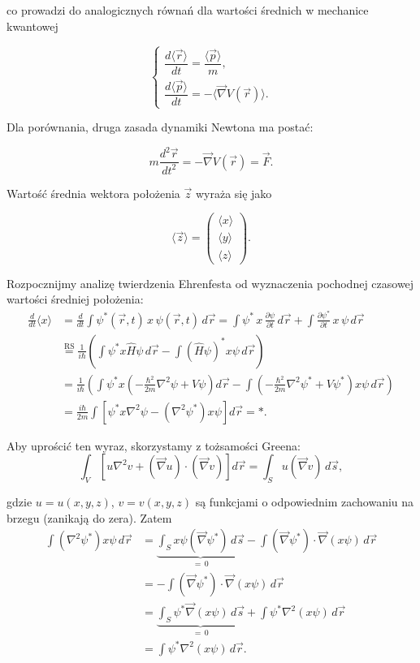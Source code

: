 co prowadzi do analogicznych równań dla wartości średnich w mechanice kwantowej

$$
\begin{cases}
    \dfrac{d \langle \vec{r} \rangle}{dt} = \dfrac{\langle \vec{p} \rangle}{m}, \\
    \dfrac{d \langle \vec{p} \rangle}{dt} = -\langle \vec{\nabla} V(\vec{r}) \rangle.
\end{cases}
$$

Dla porównania, druga zasada dynamiki Newtona ma postać:

$$
m \dfrac{d^2 \vec{r}}{dt^2} = -\vec{\nabla} V(\vec{r}) = \vec{F}.
$$

Wartość średnia wektora położenia $\vec{z}$ wyraża się jako

$$
\langle \vec{z} \rangle = 
\begin{pmatrix}
\langle x \rangle \\
\langle y \rangle \\
\langle z \rangle
\end{pmatrix}.
$$

Rozpocznijmy analizę twierdzenia Ehrenfesta od wyznaczenia pochodnej czasowej wartości średniej położenia:
\begin{align*}
\frac{d}{dt} \langle x \rangle &= \frac{d}{dt} \int \psi^*(\vec{r},t) \, x \, \psi(\vec{r},t) \, d\vec{r} = \int \psi^* \, x \, \frac{\partial \psi}{\partial t} \, d\vec{r} + \int \frac{\partial \psi^*}{\partial t} \, x \, \psi \, d\vec{r} \\
&\overset{\text{RS}}{=}\frac{1}{i\hbar} \left( \int \psi^* x \hat{H} \psi \, d\vec{r} - \int (\hat{H} \psi)^* x \psi \, d\vec{r} \right) \\
&= \frac{1}{i\hbar} \left( \int \psi^* x \left( -\frac{\hbar^2}{2m} \nabla^2 \psi + V \psi \right) d\vec{r} - \int \left( -\frac{\hbar^2}{2m} \nabla^2 \psi^* + V \psi^* \right) x \psi \, d\vec{r} \right) \\
&= \frac{i\hbar}{2m} \int \left[ \psi^* x \nabla^2 \psi - (\nabla^2 \psi^*) x \psi \right] d\vec{r} = *.
\end{align*}

Aby uprościć ten wyraz, skorzystamy z tożsamości Greena:
$$
\int_V \left[ u \nabla^2 v + (\vec{\nabla} u) \cdot (\vec{\nabla} v) \right] d\vec{r} = \int_S u (\vec{\nabla} v) \, d\vec{s},
$$

gdzie $u = u(x,y,z)$, $v = v(x,y,z)$ są funkcjami o odpowiednim zachowaniu na brzegu (zanikają do zera). Zatem
\begin{align*}
\int (\nabla^2 \psi^*) x \psi \, d\vec{r} &= \underbrace{\int_S x \psi (\vec{\nabla} \psi^*) \, d\vec{s}}_{=\,0} - \int (\vec{\nabla} \psi^*) \cdot \vec{\nabla}(x \psi) \, d\vec{r} \\
&= - \int (\vec{\nabla} \psi^*) \cdot \vec{\nabla}(x \psi) \, d\vec{r} \\
&= \underbrace{\int_S \psi^* \vec{\nabla}(x \psi) \, d\vec{s}}_{=\,0} + \int \psi^* \nabla^2 (x \psi) \, d\vec{r} \\
&= \int \psi^* \nabla^2 (x \psi) \, d\vec{r}.
\end{align*}

